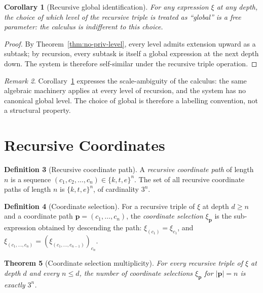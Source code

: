 \documentclass[11pt,a4paper]{article}
\theoremstyle{thmstyle}
\newtheorem{theorem}{Theorem}[section]
\newtheorem{corollary}[theorem]{Corollary}
\theoremstyle{thmstyle}
\theoremstyle{definition}
\newtheorem{definition}[theorem]{Definition}
\theoremstyle{remark}
\newtheorem{remark}[theorem]{Remark}
\begin{document}
\begin{corollary}[Recursive global identification]
\label{cor:recursive-global}
For any expression $\xi$ at any depth, the choice of
which level of the recursive triple is treated as
``global'' is a free parameter: the calculus is
indifferent to this choice.
\end{corollary}

\begin{proof}
By Theorem~\ref{thm:no-priv-level}, every level admits
extension upward as a subtask; by recursion, every
subtask is itself a global expression at the next
depth down.  The system is therefore self-similar
under the recursive triple operation.
\end{proof}

\begin{remark}\label{rem:scale-ambiguity}
Corollary~\ref{cor:recursive-global} expresses the
scale-ambiguity of the calculus: the same algebraic
machinery applies at every level of recursion, and
the system has no canonical global level.  The
choice of global is therefore a labelling convention,
not a structural property.
\end{remark}

\section{Recursive Coordinates}
\label{sec:recursive-coordinates}

\begin{definition}[Recursive coordinate path]
\label{def:rec-coord-path}
A \emph{recursive coordinate path} of length $n$ is a
sequence
$(c_{1}, c_{2}, \ldots, c_{n}) \in \{k, t, e\}^{n}$.
The set of all recursive coordinate paths of length
$n$ is $\{k, t, e\}^{n}$, of cardinality $3^{n}$.
\end{definition}

\begin{definition}[Coordinate selection]\label{def:coord-sel}
For a recursive triple of $\xi$ at depth $d \geq n$
and a coordinate path
$\bm{p} = (c_{1}, \ldots, c_{n})$, the
\emph{coordinate selection} $\xi_{\bm{p}}$ is the
sub-expression obtained by descending the path:
$\xi_{(c_{1})} = \xi_{c_{1}}$, and
$\xi_{(c_{1}, \ldots, c_{n})} =
(\xi_{(c_{1}, \ldots, c_{n-1})})_{c_{n}}$.
\end{definition}

\begin{theorem}[Coordinate selection multiplicity]
\label{thm:coord-mult}
For every recursive triple of $\xi$ at depth $d$
and every $n \leq d$, the number of coordinate
selections $\xi_{\bm{p}}$ for $|\bm{p}| = n$ is
exactly $3^{n}$.
\end{theorem}
\end{document}
